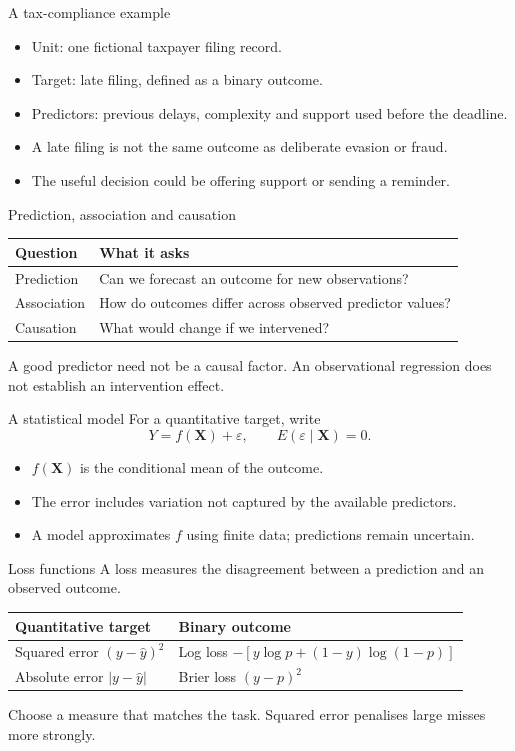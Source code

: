 \begin{frame}{A tax-compliance example}
\begin{itemize}
\item Unit: one fictional taxpayer filing record.
\item Target: late filing, defined as a binary outcome.
\item Predictors: previous delays, complexity and support used before the deadline.
\item A late filing is not the same outcome as deliberate evasion or fraud.
\item The useful decision could be offering support or sending a reminder.
\end{itemize}
\end{frame}

\begin{frame}{Prediction, association and causation}
\begin{center}\begin{tabular}{p{}p{}}\toprule
Question & What it asks\\\midrule Prediction & Can we forecast an outcome for new observations?\\ Association & How do outcomes differ across observed predictor values?\\ Causation & What would change if we intervened?\\
\bottomrule\end{tabular}\end{center}A good predictor need not be a causal factor. An observational regression does not establish an intervention effect.
\end{frame}

\begin{frame}{A statistical model}
For a quantitative target, write\[Y=f(\mathbf X)+\varepsilon,\qquad E(\varepsilon\mid\mathbf X)=0.\]\begin{itemize}
\item $f(\mathbf X)$ is the conditional mean of the outcome.
\item The error includes variation not captured by the available predictors.
\item A model approximates $f$ using finite data; predictions remain uncertain.
\end{itemize}
\end{frame}

\begin{frame}{Loss functions}
A loss measures the disagreement between a prediction and an observed outcome.\begin{center}\begin{tabular}{ll}\toprule
Quantitative target & Binary outcome\\\midrule Squared error $(y-\hat y)^2$ & Log loss $-[y\log p+(1-y)\log(1-p)]$\\ Absolute error $|y-\hat y|$ & Brier loss $(y-p)^2$\\
\bottomrule\end{tabular}\end{center}Choose a measure that matches the task. Squared error penalises large misses more strongly.
\end{frame}

